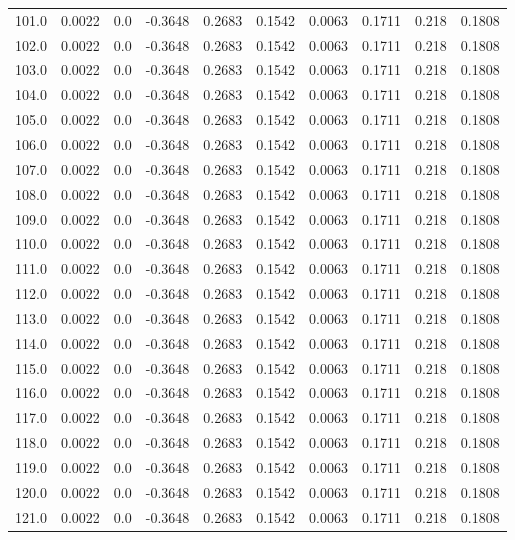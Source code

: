 \begin{longtable}{lrrrrrrrrr}
101.0 & 0.0022 & 0.0 & -0.3648 & 0.2683 & 0.1542 & 0.0063 & 0.1711 & 0.218 & 0.1808 \\
102.0 & 0.0022 & 0.0 & -0.3648 & 0.2683 & 0.1542 & 0.0063 & 0.1711 & 0.218 & 0.1808 \\
103.0 & 0.0022 & 0.0 & -0.3648 & 0.2683 & 0.1542 & 0.0063 & 0.1711 & 0.218 & 0.1808 \\
104.0 & 0.0022 & 0.0 & -0.3648 & 0.2683 & 0.1542 & 0.0063 & 0.1711 & 0.218 & 0.1808 \\
105.0 & 0.0022 & 0.0 & -0.3648 & 0.2683 & 0.1542 & 0.0063 & 0.1711 & 0.218 & 0.1808 \\
106.0 & 0.0022 & 0.0 & -0.3648 & 0.2683 & 0.1542 & 0.0063 & 0.1711 & 0.218 & 0.1808 \\
107.0 & 0.0022 & 0.0 & -0.3648 & 0.2683 & 0.1542 & 0.0063 & 0.1711 & 0.218 & 0.1808 \\
108.0 & 0.0022 & 0.0 & -0.3648 & 0.2683 & 0.1542 & 0.0063 & 0.1711 & 0.218 & 0.1808 \\
109.0 & 0.0022 & 0.0 & -0.3648 & 0.2683 & 0.1542 & 0.0063 & 0.1711 & 0.218 & 0.1808 \\
110.0 & 0.0022 & 0.0 & -0.3648 & 0.2683 & 0.1542 & 0.0063 & 0.1711 & 0.218 & 0.1808 \\
111.0 & 0.0022 & 0.0 & -0.3648 & 0.2683 & 0.1542 & 0.0063 & 0.1711 & 0.218 & 0.1808 \\
112.0 & 0.0022 & 0.0 & -0.3648 & 0.2683 & 0.1542 & 0.0063 & 0.1711 & 0.218 & 0.1808 \\
113.0 & 0.0022 & 0.0 & -0.3648 & 0.2683 & 0.1542 & 0.0063 & 0.1711 & 0.218 & 0.1808 \\
114.0 & 0.0022 & 0.0 & -0.3648 & 0.2683 & 0.1542 & 0.0063 & 0.1711 & 0.218 & 0.1808 \\
115.0 & 0.0022 & 0.0 & -0.3648 & 0.2683 & 0.1542 & 0.0063 & 0.1711 & 0.218 & 0.1808 \\
116.0 & 0.0022 & 0.0 & -0.3648 & 0.2683 & 0.1542 & 0.0063 & 0.1711 & 0.218 & 0.1808 \\
117.0 & 0.0022 & 0.0 & -0.3648 & 0.2683 & 0.1542 & 0.0063 & 0.1711 & 0.218 & 0.1808 \\
118.0 & 0.0022 & 0.0 & -0.3648 & 0.2683 & 0.1542 & 0.0063 & 0.1711 & 0.218 & 0.1808 \\
119.0 & 0.0022 & 0.0 & -0.3648 & 0.2683 & 0.1542 & 0.0063 & 0.1711 & 0.218 & 0.1808 \\
120.0 & 0.0022 & 0.0 & -0.3648 & 0.2683 & 0.1542 & 0.0063 & 0.1711 & 0.218 & 0.1808 \\
121.0 & 0.0022 & 0.0 & -0.3648 & 0.2683 & 0.1542 & 0.0063 & 0.1711 & 0.218 & 0.1808 \\

\end{longtable}
